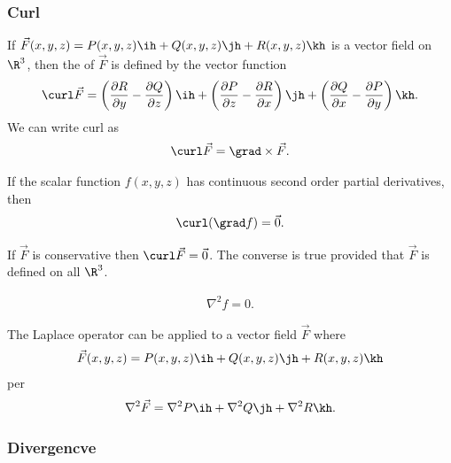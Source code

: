 \documentclass{article}
\begin{document}
\subsubsection{Curl}
\begin{definition}
    If $\vec F(x,y,z) = P(x,y,z)\ih + Q(x,y,z)\jh + R(x,y,z)\kh$ is a vector field
    on $\R^3$, then the  of $\vec F$ is defined by the vector function
    \begin{align*}
        \curl\vec F = \left(\frac{\partial R}{\partial y}-\frac{\partial Q}{\partial z}\right)\ih
        +\left(\frac{\partial P}{\partial z}-\frac{\partial R}{\partial x}\right)\jh
        +\left(\frac{\partial Q}{\partial x}-\frac{\partial P}{\partial y}\right)\kh.
    \end{align*} 
    We can write curl as
    \begin{align*}
        \curl\vec F = \grad \times \vec F.
    \end{align*}
\end{definition}
\begin{theorem}
    If the scalar function $f(x,y,z)$ has continuous second order partial derivatives,
    then
    \begin{align*}
        \curl(\grad f) = \vec 0.
    \end{align*}
\end{theorem}
\begin{corollary}
    If $\vec F$ is conservative then $\curl\vec F = \vec 0$. The converse is true
    provided that $\vec F$ is defined on all $\R^3$.
\end{corollary}
\begin{theorem}
    \begin{align*}
        \nabla^2 f = 0.
    \end{align*}
\end{theorem}
\begin{definition}
    The Laplace operator can be applied to a vector field $\vec F$ where 
    \begin{align*}
        \vec F(x,y,z) =P(x,y,z)\ih + Q(x,y,z)\jh + R(x,y,z)\kh
    \end{align*}
    per 
    \begin{align*}
        \nabla^2 \vec F = \nabla^2 P\ih + \nabla^2 Q\jh + \nabla^2 R\kh.
    \end{align*}
\end{definition}

\subsubsection{Divergencve}
\end{document}
